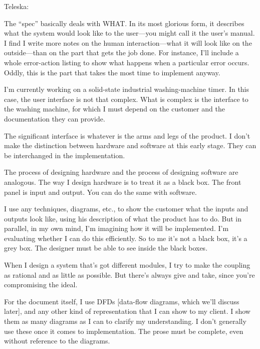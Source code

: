 \begin{interview}
Teleska:

\begin{tfquot}
The ``spec'' basically deals with WHAT. In its most glorious form, it
describes what the system would look like to the user---you might call it the
user's manual. I find I write more notes on the human interaction---what it
will look like on the outside---than on the part that gets the job done. For
instance, I'll include a whole error-action listing to show what happens when
a particular error occurs. Oddly, this is the part that takes the most time to
implement anyway.

I'm currently working on a solid-state industrial washing-machine timer. In
this case, the user interface is not that complex. What is complex is the
interface to the washing machine, for which I must depend on the customer
and the documentation they can provide.

The significant interface is whatever is the arms and legs of the product. I
don't make the distinction between hardware and software at this early
stage. They can be interchanged in the implementation.

The process of designing hardware and the process of designing software
are analogous. The way I design hardware is to treat it as a black box. The
front panel is input and output. You can do the same with software.

I use any techniques, diagrams, etc., to show the customer what the inputs
and outputs look like, using his description of what the product has to do.
But in parallel, in my own mind, I'm imagining how it will be implemented.
I'm evaluating whether I can do this efficiently. So to me it's not a black
box, it's a grey box. The designer must be able to see inside the black boxes.

When I design a system that's got different modules, I try to make the
coupling as rational and as little as possible. But there's always give and
take, since you're compromising the ideal.

For the document itself, I use DFDs {[}data-flow diagrams, which we'll
discuss later{]}, and any other kind of representation that I can show to my
client. I show them as many diagrams as I can to clarify my understanding.
I don't generally use these once it comes to implementation. The prose
must be complete, even without reference to the diagrams.
\end{tfquot}
\end{interview}

